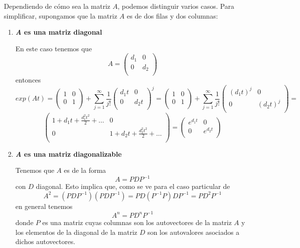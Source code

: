 Dependiendo de cómo sea la matriz $A$, podemos distinguir varios casos. Para simplificar, supongamos que la matriz $A$ es de dos filas y dos columnas:

\begin{enumerate}
\item \textbf{\textit{A} es una matriz diagonal}

En este caso tenemos que $$A = \begin{pmatrix}
d_1 & 0\\0 & d_2\\
\end{pmatrix}$$
entonces $$exp(At) = \begin{pmatrix}
1 & 0\\ 0 & 1\\
\end{pmatrix} + \sum_{j=1}^\infty \frac{1}{j!} \begin{pmatrix}
d_1t & 0\\ 0 & d_2t\\
\end{pmatrix}^j = \begin{pmatrix}
1 & 0\\ 0 & 1\\
\end{pmatrix} + \sum_{j=1}^\infty \frac{1}{j!} \begin{pmatrix}
(d_1t)^j & 0\\ 0 & (d_2t)^j\\
\end{pmatrix} = $$
$$\begin{pmatrix}
1+d_1t+\frac{d_1^2t^2}{2}+\hdots & 0\\
0 & 1+d_2t+\frac{d_2^2t^2}{2}+\hdots\\
\end{pmatrix} = \begin{pmatrix}
e^{d_1t} & 0\\ 0 & e^{d_2t}\\
\end{pmatrix}$$

\item \textbf{\textit{A} es una matriz diagonalizable}

Tenemos que $A$ es de la forma $$A = PDP^{-1}$$ con $D$ diagonal. Esto implica que, como se ve para el caso particular de $$A^2 = (PDP^{-1})(PDP^{-1}) = PD(P^{-1}P)DP^{-1} = PD^2P^{-1}$$ en general tenemos $$A^n = PD^nP^{-1}$$ donde $P$ es una matriz cuyas columnas son los autovectores de la matriz $A$ y los elementos de la diagonal de la matriz $D$ son los autovalores asociados a dichos autovectores.


\end{enumerate}
